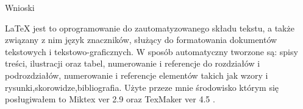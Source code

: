 \documentclass[10pt,a4paper]{article}
\begin{document}
\newpage
\begin{center}
\begin{Huge}
Wnioski\\
\end{Huge}
\end{center}
\begin{Large}
LaTeX jest to oprogramowanie do zautomatyzowanego składu tekstu, a także związany z nim język znaczników, służący do formatowania dokumentów tekstowych i tekstowo-graficznych.
W sposób automatyczny tworzone są: spisy treści, ilustracji oraz tabel, numerowanie i referencje do rozdziałów i podrozdziałów, numerowanie i referencje elementów takich jak wzory i rysunki,skorowidze,bibliografia.
Użyte przeze mnie środowisko którym się posługiwałem to Miktex ver 2.9 oraz TexMaker ver 4.5 .
\end{Large}
\end{document}
